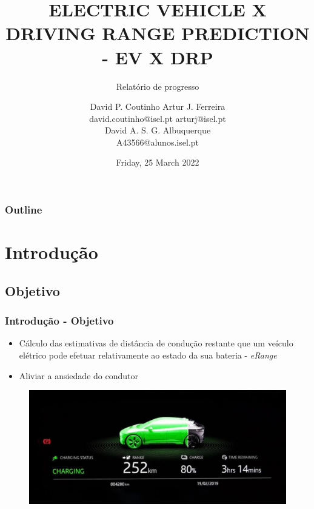 \documentclass{beamer}
\title{\uppercase{Electric Vehicle X Driving Range Prediction - EV X DRP}}
\subtitle{Relatório de progresso}
\author{
	{\large David P. Coutinho \qquad Artur J. Ferreira} \\
	{\qquad \hspace{-1cm} david.coutinho@isel.pt \qquad arturj@isel.pt} \\
    {\vspace{1cm}}
    {\large David A. S. G. Albuquerque} \\
    {A43566@alunos.isel.pt}
}
\institute
{
	\vspace{0.5cm} \\
	{\normalsize Instituto Superior de Engenharia de Lisboa } \\
}
\date{
	\vspace{-0.75cm}
	Friday, 25 March 2022
}
\begin{document}
\begin{frame}[t,plain]
    \titlepage
\end{frame}

\begin{frame}
    \frametitle{Outline}
    \tableofcontents
\end{frame}

\section[Introdução]{Introdução}
\subsection[Objetivo]{Objetivo}
\begin{frame}
\frametitle{Introdução - Objetivo}

\begin{itemize}
	\item Cálculo das estimativas de distância de condução restante 
	que um veículo elétrico pode efetuar relativamente ao estado da sua bateria - \textit{eRange}
	\item Aliviar a ansiedade do condutor
\end{itemize}

\begin{figure}[H]
    \begin{center}
        \includegraphics[scale=0.25]{./figures/erange_gauge}
    \end{center}
\end{figure}

\end{frame}
\end{document}
